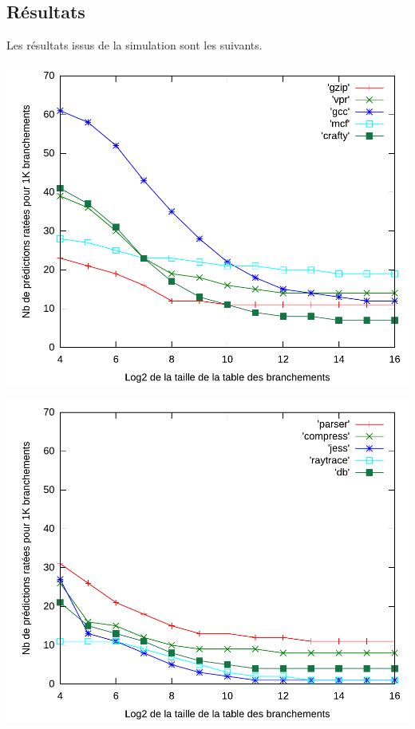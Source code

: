 \documentclass[a4paper]{article}
\begin{document}
\subsection{Résultats}
Les résultats issus de la simulation sont les suivants.
\par
\begin{minipage}{.48\linewidth}
\includegraphics[width=\linewidth]{../figures-local/local-0}
\end{minipage}%
\hfill
\begin{minipage}{.48\linewidth}
\includegraphics[width=\linewidth]{../figures-local/local-1}
\end{minipage}
\end{document}
